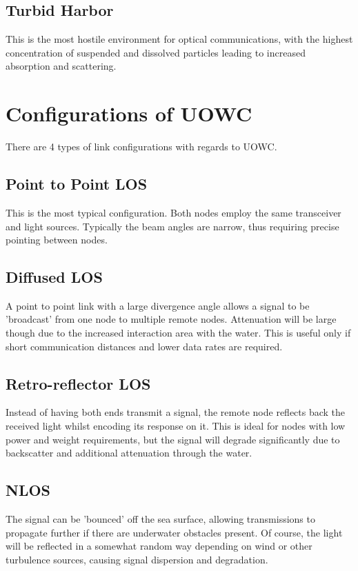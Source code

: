 \documentclass{article}
\begin{document}
\subsection{Turbid Harbor}
This is the most hostile environment for optical communications, with the highest concentration of suspended and dissolved particles leading to increased absorption and scattering.




\section{Configurations of UOWC}
There are 4 types of link configurations with regards to \ac{UOWC}.

\subsection{Point to Point \ac{LOS}}
This is the most typical configuration. Both nodes employ the same transceiver and light sources. Typically the beam angles are narrow, thus requiring precise pointing between nodes.

\subsection{Diffused \ac{LOS}}
A point to point link with a large divergence angle allows a signal to be 'broadcast' from one node to multiple remote nodes. Attenuation will be large though due to the increased interaction area with the water. This is useful only if short communication distances and lower data rates are required.

\subsection{Retro-reflector \ac{LOS}}

Instead of having both ends transmit a signal, the remote node reflects back the received light whilst encoding its response on it. This is ideal for nodes with low power and weight requirements, but the signal will degrade significantly due to backscatter and additional attenuation through the water.

\subsection{\ac{NLOS}}
The signal can be 'bounced' off the sea surface, allowing transmissions to propagate further if there are underwater obstacles present. Of course, the light will be reflected in a somewhat random way depending on wind or other turbulence sources, causing signal dispersion and degradation.
\end{document}
